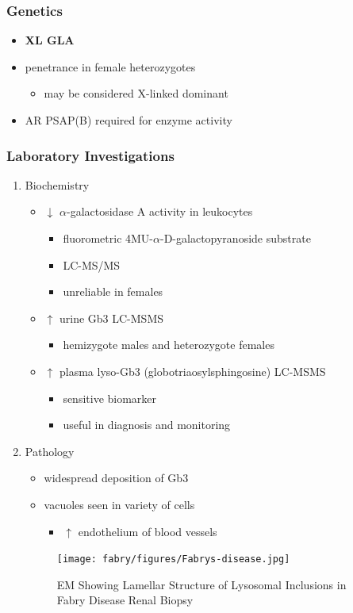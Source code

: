 \documentclass[12pt]{scrartcl}
\begin{document}
\subsubsection{Genetics}
\label{sec:org3c96df9}
\begin{itemize}
\item \textbf{XL GLA}
\item penetrance in female heterozygotes
\begin{itemize}
\item may be considered X-linked dominant
\end{itemize}
\item AR PSAP(B) required for enzyme activity
\end{itemize}
\subsubsection{Laboratory Investigations}
\label{sec:orga7c5dca}
\begin{enumerate}
\item Biochemistry
\label{sec:orge91ca08}
\begin{itemize}
\item \(\downarrow\) \(\alpha\)-galactosidase A activity in leukocytes
\begin{itemize}
\item fluorometric 4MU-\(\alpha\)-D-galactopyranoside substrate
\item LC-MS/MS
\item unreliable in females
\end{itemize}
\item \(\uparrow\) urine Gb3 LC-MSMS 
\begin{itemize}
\item hemizygote males and heterozygote females
\end{itemize}
\item \(\uparrow\) plasma lyso-Gb3 (globotriaosylsphingosine) LC-MSMS
\begin{itemize}
\item sensitive biomarker
\item useful in diagnosis and monitoring
\end{itemize}
\end{itemize}

\item Pathology
\label{sec:orgdbb43cf}
\begin{itemize}
\item widespread deposition of Gb3
\item vacuoles seen in variety of cells
\begin{itemize}
\item \(\uparrow\) endothelium of blood vessels
\end{itemize}
\end{itemize}

\begin{figure}[htbp]
\centering
\texttt{[image: fabry/figures/Fabrys-disease.jpg]}
\caption[Fabry EM]{\label{fig:orgaac1819}EM Showing Lamellar Structure of Lysosomal Inclusions in Fabry Disease Renal Biopsy}
\end{figure}
\end{enumerate}
\end{document}
